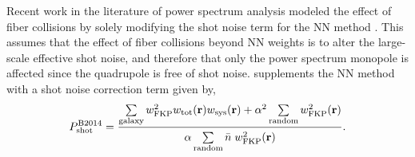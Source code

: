                                                                                                                                                                                                                                                                         Recent work in the literature of power spectrum analysis modeled the effect of fiber collisions by solely modifying the shot noise term for the NN method \citep{Beutler:2014aa, Gil-Marin:2014aa}. 
                                                                                                                                                                                                                                                                        This assumes that the effect of fiber collisions beyond NN weights is to alter the large-scale effective shot noise, and therefore that only the power spectrum monopole is affected since the quadrupole is free of shot noise. 
                                                                                                                                                                                                                                                                        \cite{Beutler:2014aa} supplements the NN method with a shot noise correction term given by,
                                                                                                                                                                                                                                                                        \begin{equation} \label{eq:florian}
                                                                                                                                                                                                                                                                        P^\mathrm{B2014}_\mathrm{shot} = \frac{\sum\limits_{\mathrm{galaxy}} w^2_\mathrm{FKP}w_\mathrm{tot}({\bf r})w_\mathrm{sys}({\bf r}) + 
                                                                                                                                                                                                                                                                        \alpha^2 \sum\limits_{\mathrm{random}} w_\mathrm{FKP}^2({\bf r})}
                                                                                                                                                                                                                                                                        {\alpha \sum\limits_{\mathrm{random}}^{ } \bar{n} \; w_\mathrm{FKP}^2({\bf r})}.
                                                                                                                                                                                                                                                                        \end{equation}
